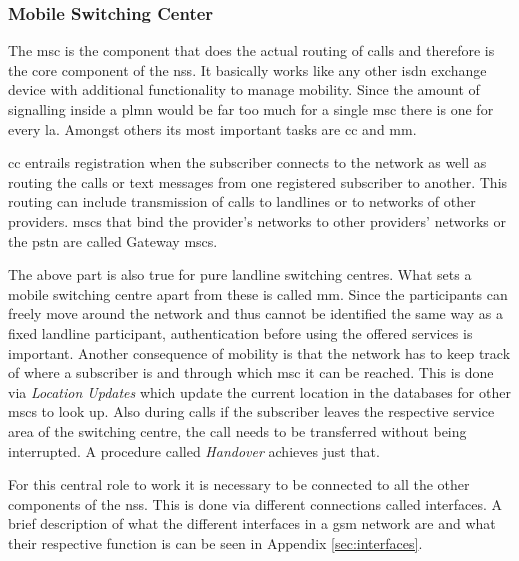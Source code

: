 \subsubsection{Mobile Switching Center}
The \gls{msc} is the component that does the actual routing of calls and therefore is the core component of the \gls{nss}.
It basically works like any other \gls{isdn} exchange device with additional functionality to manage mobility.
Since the amount of signalling inside a \gls{plmn} would be far too much for a single \gls{msc} there is one for every \gls{la}.
Amongst others its most important tasks are \gls{cc} and \gls{mm}.

\gls{cc} entrails registration when the subscriber connects to the network as well as routing the calls or text messages from one registered subscriber to another. 
This routing can include transmission of calls to landlines or to networks of other providers.
\glspl{msc} that bind the provider's networks to other providers' networks or the \gls{pstn} are called Gateway \glspl{msc}.

The above part is also true for pure landline switching centres.
What sets a mobile switching centre apart from these is called \gls{mm}.
Since the participants can freely move around the network  and thus cannot be identified the same way as a fixed landline participant, authentication before using the offered services is important.
Another consequence of mobility is that the network has to keep track of where a subscriber is and through which \gls{msc} it can be reached.
This is done via  \emph{Location Updates} which update the current location in the databases for other \glspl{msc} to look up.
Also during calls if the subscriber leaves the respective service area of the switching centre, the call needs to be transferred without being interrupted.
A procedure called \emph{Handover} achieves just that.

For this central role to work it is necessary to be connected to all the other components of the \gls{nss}.
This is done via different connections called interfaces.
A brief description of what the different interfaces in a \gls{gsm} network are and what their respective function is can be seen in Appendix \ref{sec:interfaces}.

